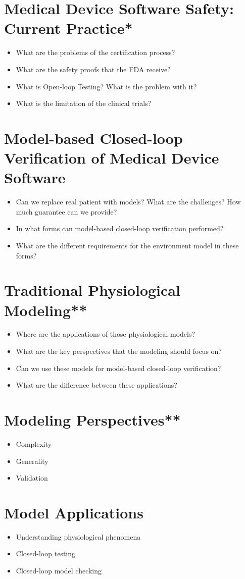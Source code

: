 \section{Medical Device Software Safety: Current Practice*}
\begin{itemize}
    \item What are the problems of the certification process?
    \item What are the safety proofs that the FDA receive?
    \item What is Open-loop Testing? What is the problem with it?
    \item What is the limitation of the clinical trials?
    
\end{itemize}

\section{Model-based Closed-loop Verification of Medical Device Software}
\begin{itemize}
	\item Can we replace real patient with models? What are the challenges? How much guarantee can we provide?
    \item In what forms can model-based closed-loop verification performed?
    \item What are the different requirements for the environment model in these forms?
\end{itemize}

\section{Traditional Physiological Modeling**}
\begin{itemize}
	\item Where are the applications of those physiological models?
    \item What are the key perspectives that the modeling should focus on?
    \item Can we use these models for model-based closed-loop verification?
    \item What are the difference between these applications?
\end{itemize}

\section{Modeling Perspectives**}
\begin{itemize}
	\item Complexity
    \item Generality
    \item Validation
\end{itemize}

\section{Model Applications}

\begin{itemize}
	\item Understanding physiological phenomena
	\item Closed-loop testing
	\item Closed-loop model checking
\end{itemize}
